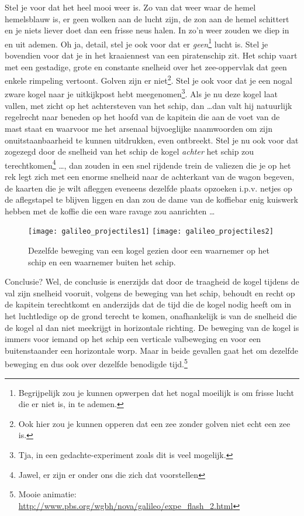 Stel je voor dat het heel mooi weer is. Zo van dat weer waar de hemel hemelsblauw is, er geen wolken aan de lucht zijn, de zon aan de hemel schittert en je niets liever doet dan een frisse neus halen. In zo'n weer zouden we diep in en uit ademen. Oh ja, detail, stel je ook voor dat er \emph{geen}\footnote{Begrijpelijk zou je kunnen opwerpen dat het nogal moeilijk is om frisse lucht die er niet is, in te ademen.} lucht is. Stel je bovendien voor dat je in het kraaiennest van een piratenschip zit. Het schip vaart met een gestadige, grote en constante snelheid over het zee-oppervlak dat geen enkele rimpeling vertoont. Golven zijn er niet\footnote{Ook hier zou je kunnen opperen dat een zee zonder golven niet echt een zee is.}. Stel je ook voor dat je een nogal zware kogel naar je uitkijkpost hebt meegenomen\footnote{Tja, in een gedachte-experiment zoals dit is veel mogelijk.}. Als je nu deze kogel laat vallen, met zicht op het achtersteven van het schip, dan \ldots dan valt hij natuurlijk regelrecht naar beneden op het hoofd van de kapitein die aan de voet van de mast staat en waarvoor me het arsenaal bijvoeglijke naamwoorden om zijn onuitstaanbaarheid te kunnen uitdrukken, even ontbreekt. Stel je nu ook voor dat zogezegd door de snelheid van het schip de kogel \emph{achter} het schip zou terechtkomen\footnote{Jawel, er zijn er onder ons die zich dat voorstellen} \ldots, dan zouden in een snel rijdende trein de valiezen die je op het rek legt zich met een enorme snelheid naar de achterkant van de wagon begeven, de kaarten die je wilt afleggen eveneens dezelfde plaats opzoeken i.p.v. netjes op de  aflegstapel te blijven liggen en dan zou de dame van de koffiebar enig kuiswerk hebben met de koffie die een ware ravage zou aanrichten \ldots 
\begin{figure}[h]
\centering
\texttt{[image: galileo\_projectiles1]} 
\texttt{[image: galileo\_projectiles2]} 
\caption{Dezelfde beweging van een kogel gezien door een waarnemer op het schip en een waarnemer buiten het schip.}
\end{figure}
Conclusie? Wel, de conclusie is enerzijds dat door de traagheid de kogel tijdens de val zijn snelheid vooruit, volgens de beweging van het schip, behoudt en recht op de kapitein terechtkomt en anderzijds dat de tijd die de kogel nodig heeft om in het luchtledige op de grond terecht te komen, onafhankelijk is van de snelheid die de kogel al dan niet meekrijgt in horizontale richting. De beweging van de kogel is immers voor iemand op het schip een verticale valbeweging en voor een buitenstaander een horizontale worp. Maar in beide gevallen gaat het om dezelfde beweging en dus ook over dezelfde benodigde tijd.\footnote{Mooie animatie: \url{http://www.pbs.org/wgbh/nova/galileo/expe_flash_2.html}}

